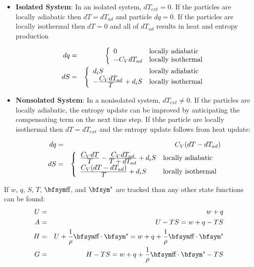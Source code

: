 \documentclass[11pt]{article}
\begin{document}
\begin{itemize}

\item {\bf Isolated System}:
In an isolated system, $dT_{ext}=0$. If the particles are locally adiabatic then $dT=dT_{ad}$ and particle $dq=0$. If the particles are locally isothermal then $dT=0$ and all of $dT_{ad}$ results in heat and entropy production

\begin{eqnarray}
           dq & = & \left\{ \begin{array}{ll}
                0 & {\rm locally\ adiabatic} \\
                -C_VdT_{ad} & {\rm locally\ isothermal}
                \end{array} \right.\\
           dS & = & \left\{ \begin{array}{ll}
                d_iS & {\rm locally\ adiabatic} \\
                -{\displaystyle C_VdT_{ad}\over \displaystyle T} + d_iS & {\rm locally\ isothermal}
                \end{array} \right.
\end{eqnarray}

\item {\bf Nonsolated System}:
In a nonisolated system, $dT_{ext}\ne0$. If the particles are locally adiabatic, the entropy update can be improved by anticipating the compensating term on the next time step. If tbhe particle are locally isothermal then $dT = dT_{ext}$ and the entropy update follows from heat update:

\begin{eqnarray}
           dq & = & C_V (dT - dT_{ad})  \\
           dS & = & \left\{ \begin{array}{ll}
                {\displaystyle C_VdT\over \displaystyle T}-{\displaystyle C_VdT_{ad}\over \displaystyle T+dT_{ad}} + d_iS& {\rm locally\ adiabatic} \\
                {\displaystyle C_V(dT-dT_{ad})\over \displaystyle T} + d_iS& {\rm locally\ isothermal}
                \end{array} \right.
\end{eqnarray}

\end{itemize}

If $w$, $q$, $S$, $T$, $\st$, and $\et$ are tracked than any other state functions can be found:
\begin{eqnarray}
           U & = & w+q \\
           A & = & U - TS = w+q-TS \\
           H & = & U + {1\over\rho} \st\cdot\et = w+q+ {1\over\rho} \st\cdot\et \\
           G & = & H-TS = w+q+ {1\over\rho} \st\cdot\et - TS
\end{eqnarray}
\end{document}
